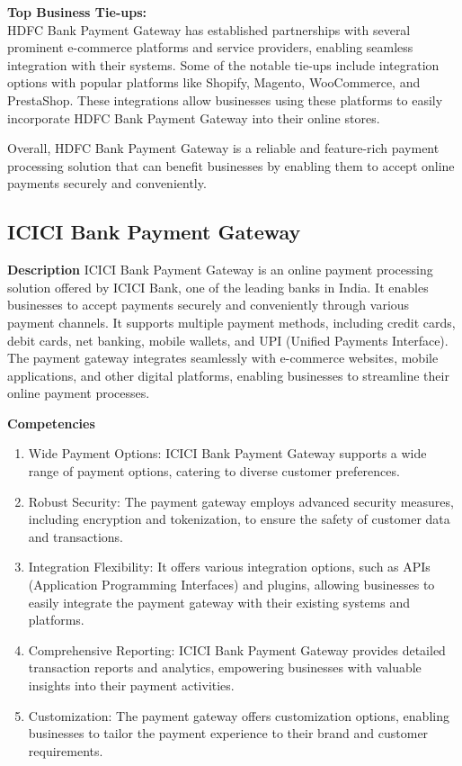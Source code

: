 \textbf{Top Business Tie-ups:} \\
HDFC Bank Payment Gateway has established partnerships with several prominent e-commerce platforms and service providers, enabling seamless integration with their systems. Some of the notable tie-ups include integration options with popular platforms like Shopify, Magento, WooCommerce, and PrestaShop. These integrations allow businesses using these platforms to easily incorporate HDFC Bank Payment Gateway into their online stores.



Overall, HDFC Bank Payment Gateway is a reliable and feature-rich payment processing solution that can benefit businesses by enabling them to accept online payments securely and conveniently.

\subsection{ICICI Bank Payment Gateway}

\textbf{Description}
ICICI Bank Payment Gateway is an online payment processing solution offered by ICICI Bank, one of the leading banks in India. It enables businesses to accept payments securely and conveniently through various payment channels. It supports multiple payment methods, including credit cards, debit cards, net banking, mobile wallets, and UPI (Unified Payments Interface). The payment gateway integrates seamlessly with e-commerce websites, mobile applications, and other digital platforms, enabling businesses to streamline their online payment processes.

\textbf{Competencies}
\begin{enumerate}
  \item Wide Payment Options: ICICI Bank Payment Gateway supports a wide range of payment options, catering to diverse customer preferences.
  \item Robust Security: The payment gateway employs advanced security measures, including encryption and tokenization, to ensure the safety of customer data and transactions.
  \item Integration Flexibility: It offers various integration options, such as APIs (Application Programming Interfaces) and plugins, allowing businesses to easily integrate the payment gateway with their existing systems and platforms.
  \item Comprehensive Reporting: ICICI Bank Payment Gateway provides detailed transaction reports and analytics, empowering businesses with valuable insights into their payment activities.
  \item Customization: The payment gateway offers customization options, enabling businesses to tailor the payment experience to their brand and customer requirements.
\end{enumerate}

